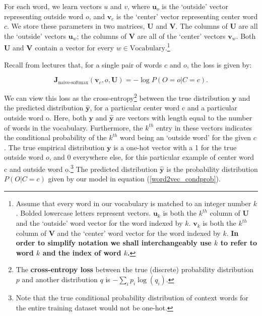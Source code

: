 \documentclass{article}
\begin{document}
For each word, we learn vectors $u$ and $v$, where $\bm u_o$ is the `outside' vector representing outside word $o$, and $\bm v_c$ is the `center' vector representing center word $c$. 
We store these parameters in two matrices, $\bm U$ and $\bm V$.
The columns of $\bm U$ are all the `outside' vectors $\bm u_{w}$;
the columns of $\bm V$ are all of the `center' vectors $\bm v_{w}$. 
Both $\bm U$ and $\bm V$ contain a vector for every $w \in \text{Vocabulary}$.\footnote{Assume that every word in our vocabulary is matched to an integer number $k$. Bolded lowercase letters represent vectors. $\bm u_{k}$ is both the $k^{th}$ column of $\bm U$ and the `outside' word vector for the word indexed by $k$. $\bm v_k$ is both the $k^{th}$ column of $\bm V$ and the `center' word vector for the word indexed by $k$. \textbf{In order to simplify notation we shall interchangeably use $k$ to refer to word $k$ and the index of word $k$.}}\newline

Recall from lectures that, for a single pair of words $c$ and $o$, the loss is given by:

\begin{equation} 
\bm J_{\text{naive-softmax}}(\bm v_c, o, \bm U) = -\log P(O=o| C=c).
\label{naive-softmax}
\end{equation}

We can view this loss as the cross-entropy\footnote{The \textbf{cross-entropy loss} between the true (discrete) probability distribution $p$ and another distribution $q$ is $-\sum_i p_i \log(q_i)$.} between the true distribution $\bm y$ and the predicted distribution $\hat{\bm y}$, for a particular center word c and a particular outside word o. 
Here, both $\bm y$ and $\hat{\bm y}$ are vectors with length equal to the number of words in the vocabulary.
Furthermore, the $k^{th}$ entry in these vectors indicates the conditional probability of the $k^{th}$ word being an `outside word' for the given $c$. 
The true empirical distribution $\bm y$ is a one-hot vector with a 1 for the true outside word $o$, and 0 everywhere else, for this particular example of center word c and outside word o.\footnote{Note that the true conditional probability distribution of context words for the entire training dataset would not be one-hot.}
The predicted distribution $\hat{\bm y}$ is the probability distribution $P(O|C=c)$ given by our model in equation (\ref{word2vec_condprob}). \newline
\end{document}
